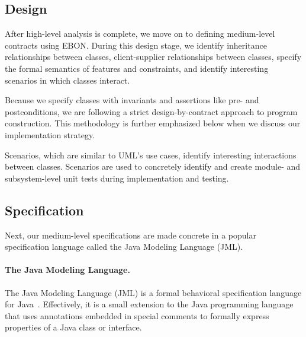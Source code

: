 \documentclass[letterpaper,twocolumn,10pt]{article}
\begin{document}
\subsection{Design}

After high-level analysis is complete, we move on to defining
medium-level contracts using EBON.  During this design stage, we
identify inheritance relationships between classes, client-supplier
relationships between classes, specify the formal semantics of
features and constraints, and identify interesting scenarios in which
classes interact.

Because we specify classes with invariants and assertions like pre-
and postconditions, we are following a strict design-by-contract
approach to program construction.  This methodology is further
emphasized below when we discuss our implementation strategy.


Scenarios, which are similar to UML's use cases, identify interesting
interactions between classes.  Scenarios are used to concretely
identify and create module- and subsystem-level unit tests during
implementation and testing.

\subsection{Specification}

Next, our medium-level specifications are made concrete in a popular
specification language called the Java Modeling Language (JML).

\paragraph{The Java Modeling Language.}

The Java Modeling Language (JML) is a formal behavioral specification
language for Java~\cite{LeavensBakerRuby99,LeavensBakerRuby-Prelim}.
Effectively, it is a small extension to the Java programming language
that uses annotations embedded in special comments to formally express
properties of a Java class or interface.
\end{document}
